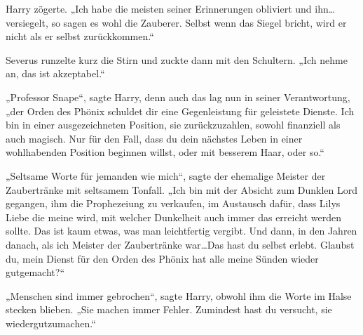 Harry zögerte.
„Ich habe die meisten seiner Erinnerungen obliviert und ihn…versiegelt, so sagen es wohl die Zauberer. Selbst wenn das Siegel bricht, wird er nicht als er selbst zurückkommen.“

Severus runzelte kurz die Stirn und zuckte dann mit den Schultern.
„Ich nehme an, das ist akzeptabel.“

„Professor Snape“, sagte Harry, denn auch das lag nun in seiner Verantwortung, „der Orden des Phönix schuldet dir eine Gegenleistung für geleistete Dienste.
Ich bin in einer ausgezeichneten Position, sie zurückzuzahlen, sowohl finanziell als auch magisch. Nur für den Fall, dass du dein nächstes Leben in einer wohlhabenden Position beginnen willst, oder mit besserem Haar, oder so.“

„Seltsame Worte für jemanden wie mich“, sagte der ehemalige Meister der Zaubertränke mit seltsamem Tonfall. „Ich bin mit der Absicht zum Dunklen Lord gegangen, ihm die Prophezeiung zu verkaufen, im Austausch dafür, dass Lilys Liebe die meine wird, mit welcher Dunkelheit auch immer das erreicht werden sollte. Das ist kaum etwas, was man leichtfertig vergibt. Und dann, in den Jahren danach, als ich Meister der Zaubertränke war…Das hast du selbst erlebt. Glaubst du, mein Dienst für den Orden des Phönix hat alle meine Sünden wieder gutgemacht?“

„Menschen sind immer gebrochen“, sagte Harry, obwohl ihm die Worte im Halse stecken blieben. „Sie machen immer Fehler. Zumindest hast du versucht, sie wiedergutzumachen.“

